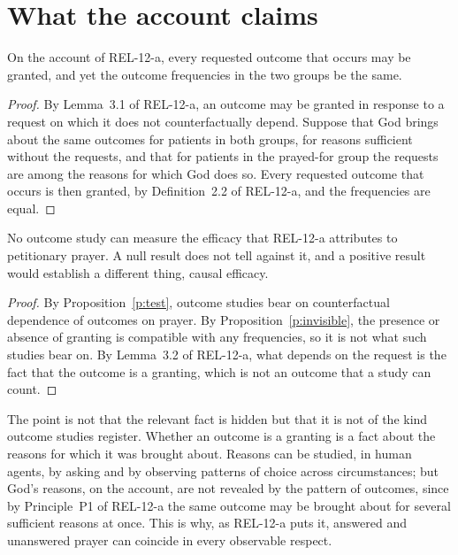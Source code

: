 \documentclass{situationist-preprint}
\begin{document}
\section{What the account claims}

\begin{proposition}\label{p:invisible}
On the account of REL-12-a, every requested outcome that occurs may be granted, and yet the outcome frequencies in the two groups be the same.
\end{proposition}

\begin{proof}
By Lemma~3.1 of REL-12-a, an outcome may be granted in response to a request on which it does not counterfactually depend. Suppose that God brings about the same outcomes for patients in both groups, for reasons sufficient without the requests, and that for patients in the prayed-for group the requests are among the reasons for which God does so. Every requested outcome that occurs is then granted, by Definition~2.2 of REL-12-a, and the frequencies are equal.
\end{proof}

\begin{corollary}\label{c:measure}
No outcome study can measure the efficacy that REL-12-a attributes to petitionary prayer. A null result does not tell against it, and a positive result would establish a different thing, causal efficacy.
\end{corollary}

\begin{proof}
By Proposition~\ref{p:test}, outcome studies bear on counterfactual dependence of outcomes on prayer. By Proposition~\ref{p:invisible}, the presence or absence of granting is compatible with any frequencies, so it is not what such studies bear on. By Lemma~3.2 of REL-12-a, what depends on the request is the fact that the outcome is a granting, which is not an outcome that a study can count.
\end{proof}

The point is not that the relevant fact is hidden but that it is not of the kind outcome studies register. Whether an outcome is a granting is a fact about the reasons for which it was brought about. Reasons can be studied, in human agents, by asking and by observing patterns of choice across circumstances; but God's reasons, on the account, are not revealed by the pattern of outcomes, since by Principle~P1 of REL-12-a the same outcome may be brought about for several sufficient reasons at once. This is why, as REL-12-a puts it, answered and unanswered prayer can coincide in every observable respect.
\end{document}
